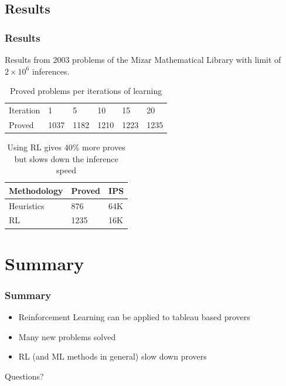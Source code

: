 \documentclass{beamer}
\begin{document}
\subsection{Results}

\begin{frame}
\frametitle{Results}
Results from 2003 problems of the Mizar Mathematical Library \citep{MML} with
limit of $2\times10^6$ inferences.
\begin{table}
\begin{tabular}{l l l l l l}
\toprule
Iteration & 1 & 5 & 10 & 15 & 20 \\
Proved & 1037 & 1182 & 1210 & 1223 & 1235 \\
\bottomrule
\end{tabular}
\caption{Proved problems per iterations of learning}
\end{table}

\begin{table}
\begin{tabular}{l l l}
\toprule
\textbf{Methodology} & \textbf{Proved} & \textbf{IPS} \\
\midrule
Heuristics & 876 & 64K \\
RL & 1235 & 16K \\
\bottomrule
\end{tabular}
\caption{Using RL gives 40\% more proves but slows down the inference speed}
\end{table}
\end{frame}

\section{Summary}

\begin{frame}
\frametitle{Summary}
\begin{itemize}
    \item Reinforcement Learning can be applied to tableau based provers
    \item Many new problems solved
    \item RL (and ML methods in general) slow down provers
\end{itemize}

\end{frame}
\begin{frame}
\Huge
\centering
Questions?
\end{frame}
\end{document}
